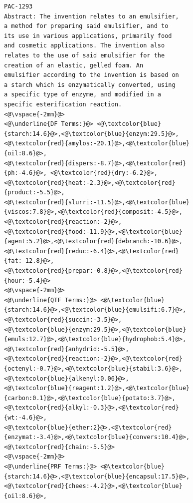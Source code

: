 \begin{figure}[t!]
\begin{framed}
\vspace*{-2ex}
  \centering
 \begin{lstlisting}[basicstyle=\scriptsize\ttfamily , linewidth=\columnwidth,breaklines=true] 
PAC-1293
Abstract: The invention relates to an emulsifier, 
a method for preparing said emulsifier, and to 
its use in various applications, primarily food 
and cosmetic applications. The invention also 
relates to the use of said emulsifier for the 
creation of an elastic, gelled foam. An 
emulsifier according to the invention is based on 
a starch which is enzymatically converted, using 
a specific type of enzyme, and modified in a 
specific esterification reaction.
<@\vspace{-2mm}@>
<@\underline{DF Terms:}@> <@\textcolor{blue}{starch:14.6}@>,<@\textcolor{blue}{enzym:29.5}@>,<@\textcolor{red}{amylos:-20.1}@>,<@\textcolor{blue}{oil:8.6}@>,
<@\textcolor{red}{dispers:-8.7}@>,<@\textcolor{red}{ph:-4.6}@>, <@\textcolor{red}{dry:-6.2}@>,<@\textcolor{red}{heat:-2.3}@>,<@\textcolor{red}{product:-5.5}@>,
<@\textcolor{red}{slurri:-11.5}@>,<@\textcolor{blue}{viscos:7.8}@>,<@\textcolor{red}{composit:-4.5}@>,<@\textcolor{red}{reaction:-2}@>,
<@\textcolor{red}{food:-11.9}@>,<@\textcolor{blue}{agent:5.2}@>,<@\textcolor{red}{debranch:-10.6}@>,<@\textcolor{red}{reduc:-6.4}@>,<@\textcolor{red}{fat:-12.8}@>,
<@\textcolor{red}{prepar:-0.8}@>,<@\textcolor{red}{hour:-5.4}@>
<@\vspace{-2mm}@>
<@\underline{QTF Terms:}@> <@\textcolor{blue}{starch:14.6}@>,<@\textcolor{blue}{emulsifi:6.7}@>,<@\textcolor{red}{succin:-3.5}@>,
<@\textcolor{blue}{enzym:29.5}@>,<@\textcolor{blue}{emuls:12.7}@>,<@\textcolor{blue}{hydrophob:5.4}@>,<@\textcolor{red}{anhydrid:-5.5}@>,
<@\textcolor{red}{reaction:-2}@>,<@\textcolor{red}{octenyl:-0.7}@>,<@\textcolor{blue}{stabil:3.6}@>,<@\textcolor{blue}{alkenyl:0.06}@>,
<@\textcolor{blue}{reagent:1.2}@>,<@\textcolor{blue}{carbon:0.1}@>,<@\textcolor{blue}{potato:3.7}@>,<@\textcolor{red}{alkyl:-0.3}@>,<@\textcolor{red}{wt:-4.6}@>,
<@\textcolor{blue}{ether:2}@>,<@\textcolor{red}{enzymat:-3.4}@>,<@\textcolor{blue}{convers:10.4}@>,<@\textcolor{red}{chain:-5.5}@>
<@\vspace{-2mm}@>
<@\underline{PRF Terms:}@> <@\textcolor{blue}{starch:14.6}@>,<@\textcolor{blue}{encapsul:17.5}@>,<@\textcolor{red}{chees:-4.2}@>,<@\textcolor{blue}{oil:8.6}@>,

\end{lstlisting}
\end{framed}
\end{figure}
